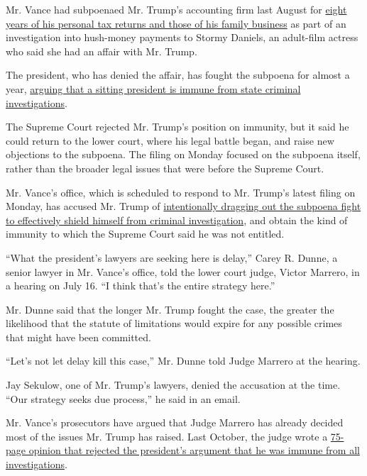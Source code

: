 Mr. Vance had subpoenaed Mr. Trump's accounting firm last August for
\href{https://www.nytimes3xbfgragh.onion/2019/09/16/nyregion/trump-tax-returns-cy-vance.html}{eight
years of his personal tax returns and those of his family business} as
part of an investigation into hush-money payments to Stormy Daniels, an
adult-film actress who said she had an affair with Mr. Trump.

The president, who has denied the affair, has fought the subpoena for
almost a year,
\href{https://www.nytimes3xbfgragh.onion/2019/09/19/nyregion/trump-tax-returns-lawsuit.html}{arguing
that a sitting president is immune from state criminal investigations}.

The Supreme Court rejected Mr. Trump's position on immunity, but it said
he could return to the lower court, where his legal battle began, and
raise new objections to the subpoena. The filing on Monday focused on
the subpoena itself, rather than the broader legal issues that were
before the Supreme Court.

Mr. Vance's office, which is scheduled to respond to Mr. Trump's latest
filing on Monday, has accused Mr. Trump of
\href{https://www.nytimes3xbfgragh.onion/2020/07/16/nyregion/donald-trump-taxes-cyrus-vance.html}{intentionally
dragging out the subpoena fight to effectively shield himself from
criminal investigation}, and obtain the kind of immunity to which the
Supreme Court said he was not entitled.

``What the president's lawyers are seeking here is delay,'' Carey R.
Dunne, a senior lawyer in Mr. Vance's office, told the lower court
judge, Victor Marrero, in a hearing on July 16. ``I think that's the
entire strategy here.''

Mr. Dunne said that the longer Mr. Trump fought the case, the greater
the likelihood that the statute of limitations would expire for any
possible crimes that might have been committed.

``Let's not let delay kill this case,'' Mr. Dunne told Judge Marrero at
the hearing.

Jay Sekulow, one of Mr. Trump's lawyers, denied the accusation at the
time. ``Our strategy seeks due process,'' he said in an email.

Mr. Vance's prosecutors have argued that Judge Marrero has already
decided most of the issues Mr. Trump has raised. Last October, the judge
wrote a
\href{https://www.nytimes3xbfgragh.onion/2019/10/07/nyregion/trump-taxes-lawsuit-vance.html}{75-page
opinion that rejected the president's argument that he was immune from
all investigations}.

